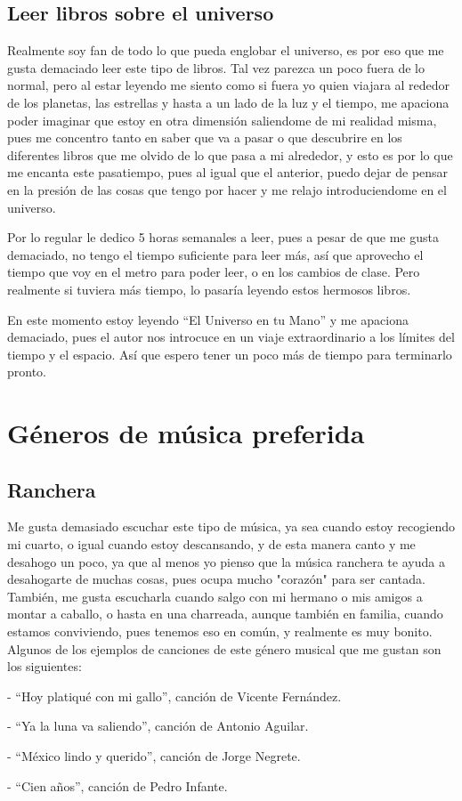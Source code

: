 \documentclass[letterpaper,12pt]{article}
\begin{document}
    \subsection{\Large{Leer libros sobre el universo}} \large{Realmente soy fan de todo lo que pueda englobar el universo, es por eso que me gusta demaciado leer este tipo de libros. Tal vez parezca un poco fuera de lo normal, pero al estar leyendo me siento como si fuera yo quien viajara al rededor de los planetas, las estrellas y hasta a un lado de la luz y el tiempo, me apaciona poder imaginar que estoy en otra dimensión saliendome de mi realidad misma, pues me concentro tanto en saber que va a pasar o que descubrire en los diferentes libros que me olvido de lo que pasa a mi alrededor, y esto es por lo que me encanta este pasatiempo, pues al igual que el anterior, puedo dejar de pensar en la presión de las cosas que tengo por hacer y me relajo introduciendome en el universo.
    
    Por lo regular le dedico 5 horas semanales a leer, pues a pesar de que me gusta demaciado, no tengo el tiempo suficiente para leer más, así que aprovecho el tiempo que voy en el metro para poder leer, o en los cambios de clase. Pero realmente si tuviera más tiempo, lo pasaría leyendo estos hermosos libros. 
    
    En este momento estoy leyendo ``El Universo en tu Mano'' y me apaciona demaciado, pues el autor nos introcuce en un viaje extraordinario a los límites del tiempo y el espacio. Así que espero tener un poco más de tiempo para terminarlo pronto.}
    
\section{\huge{Géneros de música preferida}}
    \subsection{\Large{Ranchera}} \large{Me gusta demasiado escuchar este tipo de música, ya sea cuando estoy recogiendo mi cuarto, o igual cuando estoy descansando, y de esta manera canto y me desahogo un poco, ya que al menos yo pienso que la música ranchera te ayuda a desahogarte de muchas cosas, pues ocupa mucho "corazón" para ser cantada. También, me gusta escucharla cuando salgo con mi hermano o mis amigos a montar a caballo, o hasta en una charreada, aunque también en familia, cuando estamos conviviendo, pues tenemos eso en común, y realmente es muy bonito. Algunos de los ejemplos de canciones de este género musical que me gustan son los siguientes:
    
    - ``Hoy platiqué con mi gallo'', canción de Vicente Fernández.
    
    - ``Ya la luna va saliendo'', canción de Antonio Aguilar.
    
    - ``México lindo y querido'', canción de Jorge Negrete.
    
    - ``Cien años'', canción de Pedro Infante.}
\end{document}
